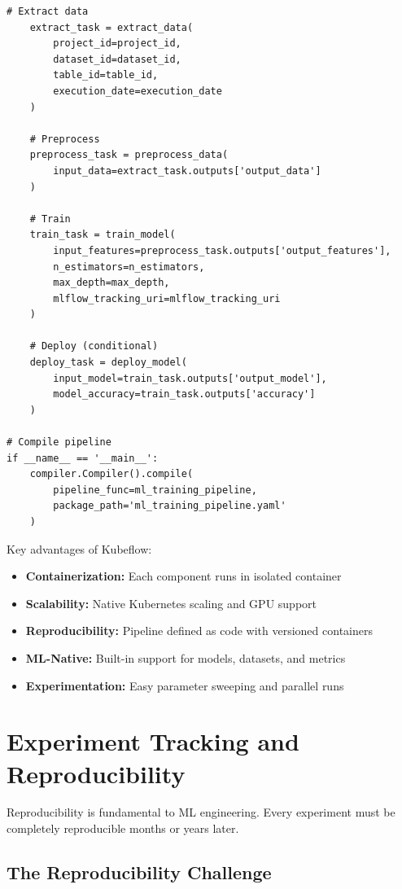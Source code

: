 \begin{lstlisting}[style=python, caption=Kubeflow Pipeline for Distributed Training]
    # Extract data
    extract_task = extract_data(
        project_id=project_id,
        dataset_id=dataset_id,
        table_id=table_id,
        execution_date=execution_date
    )

    # Preprocess
    preprocess_task = preprocess_data(
        input_data=extract_task.outputs['output_data']
    )

    # Train
    train_task = train_model(
        input_features=preprocess_task.outputs['output_features'],
        n_estimators=n_estimators,
        max_depth=max_depth,
        mlflow_tracking_uri=mlflow_tracking_uri
    )

    # Deploy (conditional)
    deploy_task = deploy_model(
        input_model=train_task.outputs['output_model'],
        model_accuracy=train_task.outputs['accuracy']
    )

# Compile pipeline
if __name__ == '__main__':
    compiler.Compiler().compile(
        pipeline_func=ml_training_pipeline,
        package_path='ml_training_pipeline.yaml'
    )
\end{lstlisting}

Key advantages of Kubeflow:
\begin{itemize}
    \item \textbf{Containerization:} Each component runs in isolated container
    \item \textbf{Scalability:} Native Kubernetes scaling and GPU support
    \item \textbf{Reproducibility:} Pipeline defined as code with versioned containers
    \item \textbf{ML-Native:} Built-in support for models, datasets, and metrics
    \item \textbf{Experimentation:} Easy parameter sweeping and parallel runs
\end{itemize}

\section{Experiment Tracking and Reproducibility}

Reproducibility is fundamental to ML engineering. Every experiment must be completely reproducible months or years later.

\subsection{The Reproducibility Challenge}

